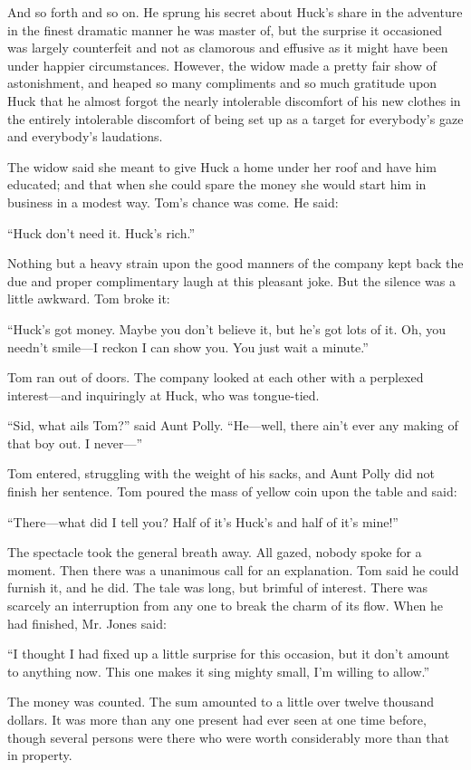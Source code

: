 \documentclass{book}
\begin{document}
And so forth and so on. He sprung his secret about Huck’s share in the adventure in the finest dramatic manner he was master of, but the surprise it occasioned was largely counterfeit and not as clamorous and effusive as it might have been under happier circumstances. However, the widow made a pretty fair show of astonishment, and heaped so many compliments and so much gratitude upon Huck that he almost forgot the nearly intolerable discomfort of his new clothes in the entirely intolerable discomfort of being set up as a target for everybody’s gaze and everybody’s laudations.

The widow said she meant to give Huck a home under her roof and have him educated; and that when she could spare the money she would start him in business in a modest way. Tom’s chance was come. He said:

“Huck don’t need it. Huck’s rich.”

Nothing but a heavy strain upon the good manners of the company kept back the due and proper complimentary laugh at this pleasant joke. But the silence was a little awkward. Tom broke it:

“Huck’s got money. Maybe you don’t believe it, but he’s got lots of it. Oh, you needn’t smile—I reckon I can show you. You just wait a minute.”

Tom ran out of doors. The company looked at each other with a perplexed interest—and inquiringly at Huck, who was tongue-tied.

“Sid, what ails Tom?” said Aunt Polly. “He—well, there ain’t ever any making of that boy out. I never—”

Tom entered, struggling with the weight of his sacks, and Aunt Polly did not finish her sentence. Tom poured the mass of yellow coin upon the table and said:

“There—what did I tell you? Half of it’s Huck’s and half of it’s mine!”

The spectacle took the general breath away. All gazed, nobody spoke for a moment. Then there was a unanimous call for an explanation. Tom said he could furnish it, and he did. The tale was long, but brimful of interest. There was scarcely an interruption from any one to break the charm of its flow. When he had finished, Mr. Jones said:

“I thought I had fixed up a little surprise for this occasion, but it don’t amount to anything now. This one makes it sing mighty small, I’m willing to allow.”

The money was counted. The sum amounted to a little over twelve thousand dollars. It was more than any one present had ever seen at one time before, though several persons were there who were worth considerably more than that in property.
\end{document}
